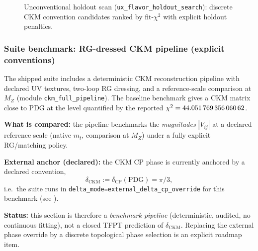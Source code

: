\begin{figure}[H]
\centering
{}
\caption{Unconventional holdout scan (\texttt{ux\_flavor\_holdout\_search}): discrete CKM convention candidates ranked by fit-$\chi^2$ with explicit holdout penalties.}
\end{figure}

\subsubsection{Suite benchmark: RG-dressed CKM pipeline (explicit conventions)}
The shipped suite includes a deterministic CKM reconstruction pipeline with declared UV textures, two-loop RG dressing, and a reference-scale comparison at $M_Z$ (module \texttt{ckm\_full\_pipeline}). The baseline benchmark gives a CKM matrix close to PDG at the level quantified by the reported $\chi^2=\num{44.05176935606062}$.

\begin{tcolorbox}[colback=yellow!3, colframe=yellow!60!black, breakable,
title={\textbf{Benchmark hygiene: explicit external phase override (no hidden fit)}}, fonttitle=\bfseries\small]
\textbf{What is compared:} the pipeline benchmarks the \emph{magnitudes} $|V_{ij}|$ at a declared reference scale (native $m_t$, comparison at $M_Z$) under a fully explicit RG/matching policy.

\textbf{External anchor (declared):} the CKM CP phase is currently anchored by a declared convention,
\[
\delta_{\mathrm{CKM}} := \delta_{\mathrm{CP}}(\mathrm{PDG}) = \pi/3,
\]
i.e.\ the suite runs in \texttt{delta\_mode=external\_delta\_cp\_override} for this benchmark (see ).

\textbf{Status:} this section is therefore a \emph{benchmark pipeline} (deterministic, audited, no continuous fitting), not a closed TFPT prediction of $\delta_{\mathrm{CKM}}$. Replacing the external phase override by a discrete topological phase selection is an explicit roadmap item.
\end{tcolorbox}

\TFPTCKMMatrixBlock

\TFPTYukawaTextureBlock

\TFPTYukawaHeatmapPlot

